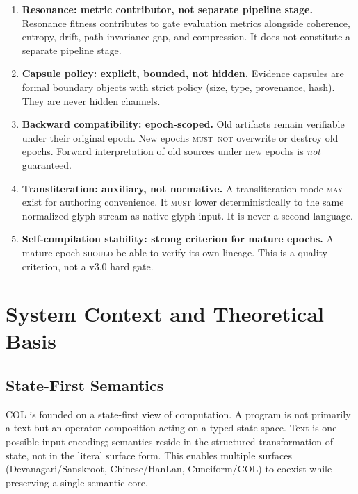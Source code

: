 \documentclass[11pt,a4paper,twoside]{article}
\theoremstyle{definition}
\theoremstyle{remark}
\newcommand{\must}{\textsc{must}}
\newcommand{\mustnot}{\textsc{must~not}}
\newcommand{\should}{\textsc{should}}
\newcommand{\may}{\textsc{may}}
\begin{document}
\begin{enumerate}[label=\textbf{SD-\arabic*},leftmargin=3cm]
  \item \textbf{Resonance: metric contributor, not separate pipeline stage.} Resonance fitness contributes to gate evaluation metrics alongside coherence, entropy, drift, path-invariance gap, and compression. It does not constitute a separate pipeline stage.

  \item \textbf{Capsule policy: explicit, bounded, not hidden.} Evidence capsules are formal boundary objects with strict policy (size, type, provenance, hash). They are never hidden channels.

  \item \textbf{Backward compatibility: epoch-scoped.} Old artifacts remain verifiable under their original epoch. New epochs \mustnot{} overwrite or destroy old epochs. Forward interpretation of old sources under new epochs is \emph{not} guaranteed.

  \item \textbf{Transliteration: auxiliary, not normative.} A transliteration mode \may{} exist for authoring convenience. It \must{} lower deterministically to the same normalized glyph stream as native glyph input. It is never a second language.

  \item \textbf{Self-compilation stability: strong criterion for mature epochs.} A mature epoch \should{} be able to verify its own lineage. This is a quality criterion, not a v3.0 hard gate.
\end{enumerate}



\section{System Context and Theoretical Basis}
\label{sec:theory}

\subsection{State-First Semantics}
\label{sec:state-first}

COL is founded on a state-first view of computation. A program is not primarily a text but an operator composition acting on a typed state space. Text is one possible input encoding; semantics reside in the structured transformation of state, not in the literal surface form. This enables multiple surfaces (Devanagari/Sanskroot, Chinese/HanLan, Cuneiform/COL) to coexist while preserving a single semantic core.
\end{document}
